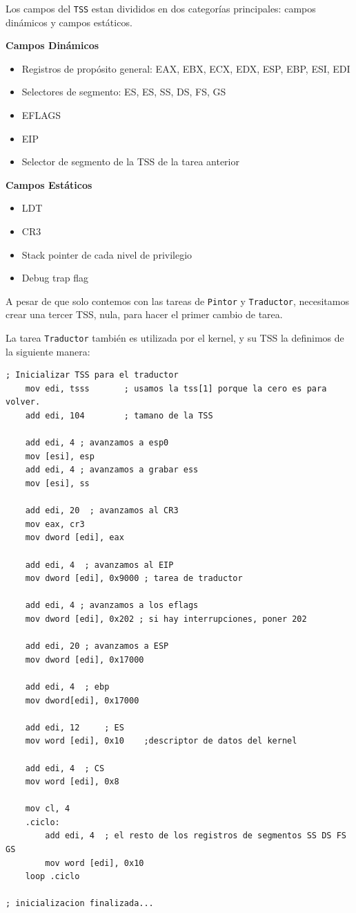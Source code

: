 \documentclass[a4paper, 10pt]{article}
\begin{document}
Los campos del \texttt{TSS} estan divididos en dos categor\'ias principales: campos din\'amicos y campos est\'aticos.

\textbf{Campos Din\'amicos}
\begin{itemize}
	\item Registros de prop\'osito general: EAX, EBX, ECX, EDX, ESP, EBP, ESI, EDI
	\item Selectores de segmento: ES, ES, SS, DS, FS, GS
	\item EFLAGS
	\item EIP
	\item Selector de segmento de la TSS de la tarea anterior
\end{itemize}

\textbf{Campos Est\'aticos}
\begin{itemize}
	\item LDT
	\item CR3
	\item Stack pointer de cada nivel de privilegio
	\item Debug trap flag
\end{itemize}

\newpage

A pesar de que solo contemos con las tareas de \texttt{Pintor} y \texttt{Traductor}, necesitamos crear una tercer TSS, nula, para hacer el primer cambio de tarea.

La tarea \texttt{Traductor} tambi\'en es utilizada por el kernel, y su TSS la definimos de la siguiente manera:

\lstset{language=[x86masm]Assembler}
\begin{lstlisting}
; Inicializar TSS para el traductor
	mov edi, tsss		; usamos la tss[1] porque la cero es para volver. 
	add edi, 104		; tamano de la TSS
	
	add edi, 4 ; avanzamos a esp0
	mov [esi], esp
	add edi, 4 ; avanzamos a grabar ess
	mov [esi], ss
	
	add edi, 20  ; avanzamos al CR3
	mov eax, cr3
	mov dword [edi], eax
	
	add edi, 4  ; avanzamos al EIP
	mov dword [edi], 0x9000 ; tarea de traductor
	
	add edi, 4 ; avanzamos a los eflags
	mov dword [edi], 0x202 ; si hay interrupciones, poner 202
	
	add edi, 20 ; avanzamos a ESP
	mov dword [edi], 0x17000
	
	add edi, 4	; ebp
	mov dword[edi], 0x17000
	
	add edi, 12 	; ES
	mov word [edi], 0x10	;descriptor de datos del kernel
	
	add edi, 4	; CS
	mov word [edi], 0x8
	
	mov cl, 4
	.ciclo:
		add edi, 4	; el resto de los registros de segmentos SS DS FS GS
		mov word [edi], 0x10
	loop .ciclo
	
; inicializacion finalizada...
\end{lstlisting}
\end{document}
